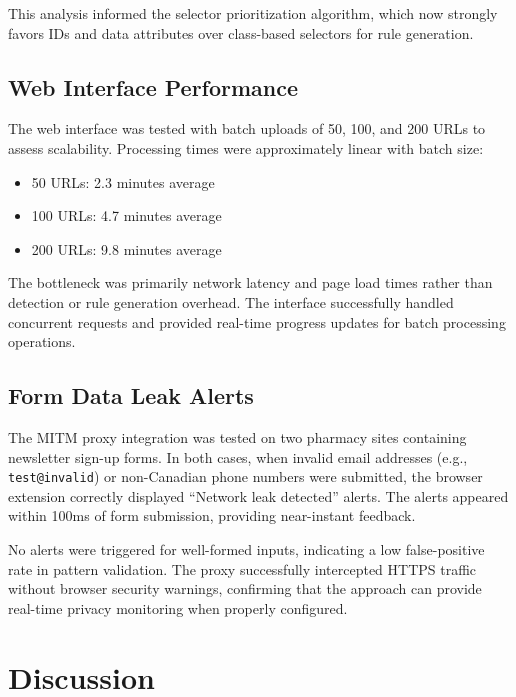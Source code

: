 \documentclass[conference]{IEEEtran}
\begin{document}
This analysis informed the selector prioritization algorithm, which now strongly favors IDs and data attributes over class-based selectors for rule generation.

\subsection{Web Interface Performance}

The web interface was tested with batch uploads of 50, 100, and 200 URLs to assess scalability. Processing times were approximately linear with batch size:

\begin{itemize}

    \item 50 URLs: 2.3 minutes average

    \item 100 URLs: 4.7 minutes average

    \item 200 URLs: 9.8 minutes average

\end{itemize}

The bottleneck was primarily network latency and page load times rather than detection or rule generation overhead. The interface successfully handled concurrent requests and provided real-time progress updates for batch processing operations.

\subsection{Form Data Leak Alerts}

The MITM proxy integration was tested on two pharmacy sites containing newsletter sign-up forms. In both cases, when invalid email addresses (e.g., \texttt{test@invalid}) or non-Canadian phone numbers were submitted, the browser extension correctly displayed ``Network leak detected'' alerts. The alerts appeared within 100ms of form submission, providing near-instant feedback.

No alerts were triggered for well-formed inputs, indicating a low false-positive rate in pattern validation. The proxy successfully intercepted HTTPS traffic without browser security warnings, confirming that the approach can provide real-time privacy monitoring when properly configured.

\section{Discussion}
\end{document}
